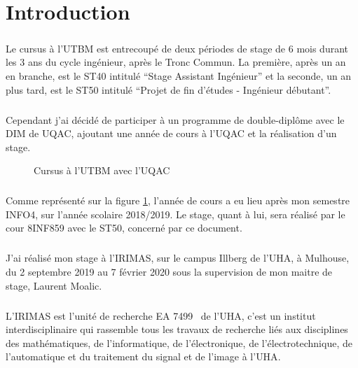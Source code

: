 \documentclass[a4paper,11pt,twoside,french,report]{../common/simplem}
\begin{document}
	\chapter*{Introduction}
		\paragraph*{}
			Le cursus à l'\gls{UTBM} est entrecoupé de deux périodes de stage de 6 mois durant les 3 ans du cycle ingénieur, après le Tronc Commun. La première, après un an en branche, est le ST40 intitulé ``Stage Assistant Ingénieur'' et la seconde, un an plus tard, est le ST50 intitulé ``Projet de fin d'études - Ingénieur débutant''.
		\paragraph*{}
			Cependant j'ai décidé de participer à un programme de double-diplôme avec le \gls{DIM} de \gls{UQAC}, ajoutant une année de cours à l'\gls{UQAC} et la réalisation d'un stage.
			\begin{figure}[H]
				\centering%
				\caption{Cursus à l'\acrshort{UTBM} avec l'\acrshort{UQAC}}%
				\label{fig:cursus_utbm_uqac}%
			\end{figure}
		\paragraph*{}
			Comme représenté sur la figure \ref{fig:cursus_utbm_uqac}, l'année de cours a eu lieu après mon semestre INFO4, sur l'année scolaire 2018/2019. Le stage, quant à lui, sera réalisé par le cour \gls{8INF859} avec le \gls{ST50}, concerné par ce document.
		\paragraph*{}
			J'ai réalisé mon stage à l'\gls{IRIMAS}, sur le campus Illberg de l'\gls{UHA}, à Mulhouse, du 2 septembre 2019 au 7 février 2020 sous la supervision de mon maitre de stage, Laurent Moalic.
		\paragraph*{}
			L'\gls{IRIMAS} est l'unité de recherche EA 7499~\cite{RNSR_IRIMAS} de l'\gls{UHA}, c'est un institut interdisciplinaire qui rassemble tous les travaux de recherche liés aux disciplines des mathématiques, de l'informatique, de l'électronique, de l'électrotechnique, de l'automatique et du traitement du signal et de l'image à l'\gls{UHA}.
\end{document}

